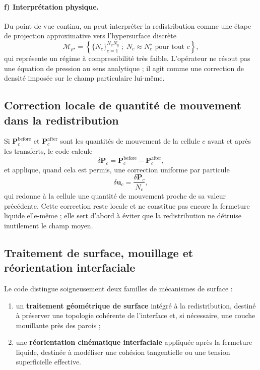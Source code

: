 \documentclass[11pt,a4paper]{article}
\begin{document}
\paragraph{f) Interprétation physique.}
Du point de vue continu, on peut interpréter la redistribution comme une étape de projection approximative vers l'hypersurface discrète
\begin{equation}
  \mathcal{M}_{\rho^{\star}} = \left\{ \{N_c\}_{c=1}^{N_xN_y} \; ; \; N_c \approx N_c^{\star} \text{ pour tout } c \right\},
\end{equation}
qui représente un régime à compressibilité très faible. L'opérateur ne résout pas une équation de pression au sens analytique ; il agit comme une correction de densité imposée sur le champ particulaire lui-même.

\subsection{Correction locale de quantité de mouvement dans la redistribution}

Si $\bm{P}_c^{\mathrm{before}}$ et $\bm{P}_c^{\mathrm{after}}$ sont les quantités de mouvement de la cellule $c$ avant et après les transferts, le code calcule
\begin{equation}
 \delta \bm{P}_c = \bm{P}_c^{\mathrm{before}} - \bm{P}_c^{\mathrm{after}},
\end{equation}
et applique, quand cela est permis, une correction uniforme par particule
\begin{equation}
 \delta \bm{u}_c = \frac{\delta \bm{P}_c}{N_c},
\end{equation}
qui redonne à la cellule une quantité de mouvement proche de sa valeur précédente. Cette correction reste locale et ne constitue pas encore la fermeture liquide elle-même ; elle sert d'abord à éviter que la redistribution ne détruise inutilement le champ moyen.


\subsection{Traitement de surface, mouillage et réorientation interfaciale}

Le code distingue soigneusement deux familles de mécanismes de surface :
\begin{enumerate}[label=\alph*)]
  \item un \textbf{traitement géométrique de surface} intégré à la redistribution, destiné à préserver une topologie cohérente de l'interface et, si nécessaire, une couche mouillante près des parois ;
  \item une \textbf{réorientation cinématique interfaciale} appliquée après la fermeture liquide, destinée à modéliser une cohésion tangentielle ou une tension superficielle effective.
\end{enumerate}
\end{document}
